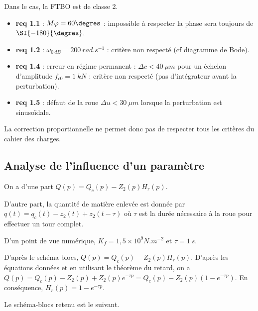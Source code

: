 \begin{multicols}{2}
\ifprof
\begin{corrige}
Dans le cas, la FTBO est de classe 2.
\begin{itemize}
\item \textbf{req 1.1} : $M\varphi = 60\degres$ : impossible à respecter la phase sera toujours de $\SI{-180}{\degres}$.
\item \textbf{req 1.2} : $\omega_{\SI{0}{dB}}=\SI{200}{rad.s^{-1}}$ : critère non respecté (cf diagramme de Bode).
\item \textbf{req 1.4} : erreur en régime permanent : $\Delta c < \SI{40}{\mu m}$ pour un échelon d'amplitude $f_{c0}=\SI{1}{kN}$ : critère non respecté (pas d'intégrateur avant la perturbation).
\item \textbf{req 1.5} : défaut de la roue $\Delta u < \SI{30}{\mu m}$ lorsque la perturbation est sinusoïdale.
\end{itemize}

La correction proportionnelle ne permet donc pas de respecter tous les critères du cahier des charges.


\end{corrige}
\else
\fi

\subsection*{Analyse de l'influence d'un paramètre}

On a d'une part $Q(p) =Q_c (p)-Z_2(p)H_r (p)$. 

D'autre part, la quantité de matière enlevée est donnée par $q(t)=q_c(t)-z_2(t)+z_2\left( t-\tau\right)$ où $\tau$ est la durée nécessaire à la roue pour effectuer
un tour complet. 

D’un point de vue numérique, $K_f = 1,5 \times 10^9 \si{N.m^{-2}}$ et $\tau = \SI{1}{s}$. 

\ifprof
\begin{corrige}
D'après le schéma-blocs, $Q(p)=Q_c(p)-Z_2(p)H_r(p)$. 
D'après les équations données et en utilisant le théorème du retard, on a $Q(p)=Q_c(p)-Z_2(p)+Z_2(p)e^{-\tau p}=Q_c(p)-Z_2(p)\left(1-e^{-\tau p}\right)$. En conséquence, $H_r(p)=1-e^{-\tau p}$.
\end{corrige}
\else
\fi

Le schéma-blocs retenu est le suivant. 


\end{multicols}
